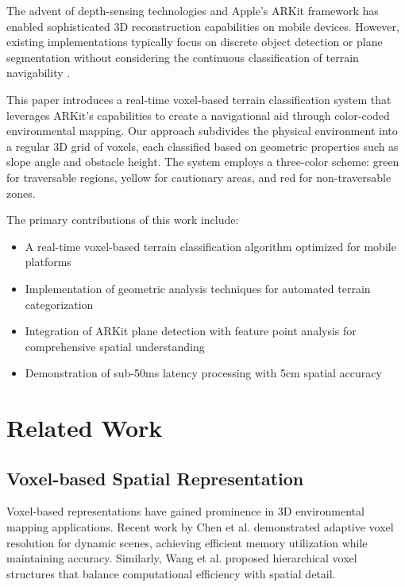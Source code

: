\documentclass[conference]{IEEEtran}
\begin{document}
The advent of depth-sensing technologies and Apple's ARKit framework has enabled sophisticated 3D reconstruction capabilities on mobile devices. However, existing implementations typically focus on discrete object detection or plane segmentation without considering the continuous classification of terrain navigability \cite{Kumar2023arkit}.

This paper introduces a real-time voxel-based terrain classification system that leverages ARKit's capabilities to create a navigational aid through color-coded environmental mapping. Our approach subdivides the physical environment into a regular 3D grid of voxels, each classified based on geometric properties such as slope angle and obstacle height. The system employs a three-color scheme: green for traversable regions, yellow for cautionary areas, and red for non-traversable zones.

The primary contributions of this work include:
\begin{itemize}
    \item A real-time voxel-based terrain classification algorithm optimized for mobile platforms
    \item Implementation of geometric analysis techniques for automated terrain categorization
    \item Integration of ARKit plane detection with feature point analysis for comprehensive spatial understanding
    \item Demonstration of sub-50ms latency processing with 5cm spatial accuracy
\end{itemize}

\section{Related Work}

\subsection{Voxel-based Spatial Representation}

Voxel-based representations have gained prominence in 3D environmental mapping applications. Recent work by Chen et al. \cite{Chen2022voxelMapping} demonstrated adaptive voxel resolution for dynamic scenes, achieving efficient memory utilization while maintaining accuracy. Similarly, Wang et al. \cite{Wang2023adaptiveVoxel} proposed hierarchical voxel structures that balance computational efficiency with spatial detail.
\end{document}
